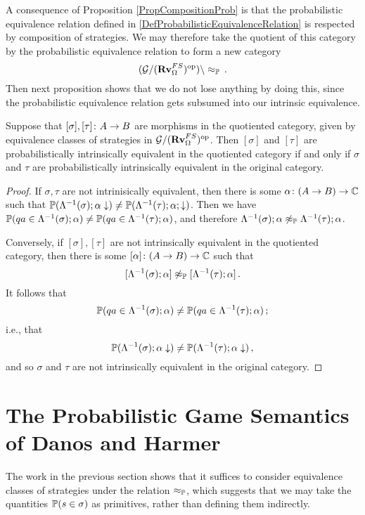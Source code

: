 A consequence of Proposition \ref{PropCompositionProb} is that the probabilistic equivalence relation defined in \ref{DefProbabilisticEquivalenceRelation} is respected by composition of strategies.
We may therefore take the quotient of this category by the probabilistic equivalence relation to form a new category
\[
  (\G/\oppcat{(\Rv_{\Omega}^{FS})})\char`\\\approx_\bP\,.
  \]
Then next proposition shows that we do not lose anything by doing this, since the probabilistic equivalence relation gets subsumed into our intrinsic equivalence.

\begin{proposition}
  Suppose that $[\sigma],[\tau]\colon A \to B$ are morphisms in the quotiented category, given by equivalence classes of strategies in $\mathcal G/({\normalfont\textbf{Rv}}_\Omega^{FS})^{\mathrm{op}}$.
  Then $[\sigma]$ and $[\tau]$ are probabilistically intrinsically equivalent in the quotiented category if and only if $\sigma$ and $\tau$ are probabilistically intrinsically equivalent in the original category.
\end{proposition}
\begin{proof}
  If $\sigma,\tau$ are not intrinisically equivalent, then there is some $\alpha\colon(A \to B) \to \mathbb{C}$ such that $\mathbb{P}(\Lambda^{-1}(\sigma);\alpha\downarrow)\ne\mathbb{P}(\Lambda^{-1}(\tau);\alpha;\downarrow)$.
  Then we have $\mathbb{P}(qa\in\Lambda^{-1}(\sigma);\alpha) \ne \mathbb{P}(qa\in\Lambda^{-1}(\tau);\alpha)$, and therefore $\Lambda^{-1}(\sigma);\alpha\not\approx_{\mathbb{P}}\Lambda^{-1}(\tau);\alpha$.

  Conversely, if $[\sigma],[\tau]$ are not intrinsically equivalent in the quotiented category, then there is some $[\alpha]\colon (A \to B) \to \mathbb{C}$ such that
  \[
    [\Lambda^{-1}(\sigma);\alpha] \not\approx_{\mathbb{P}} [\Lambda^{-1}(\tau);\alpha]\,.
    \]
  It follows that
  \[
    \mathbb{P}(qa\in\Lambda^{-1}(\sigma);\alpha) \ne \mathbb{P}(qa\in\Lambda^{-1}(\tau);\alpha)\,;
    \]
  i.e., that
  \[
    \mathbb{P}(\Lambda^{-1}(\sigma);\alpha\downarrow) \ne \mathbb{P}(\Lambda^{-1}(\tau);\alpha\downarrow)\,,
    \]
  and so $\sigma$ and $\tau$ are not intrinsically equivalent in the original category.
\end{proof}

\section{The Probabilistic Game Semantics of Danos and Harmer}

The work in the previous section shows that it suffices to consider equivalence classes of strategies under the relation $\approx_{\mathbb{P}}$, which suggests that we may take the quantities $\mathbb{P}(s\in\sigma)$ as primitives, rather than defining them indirectly.

